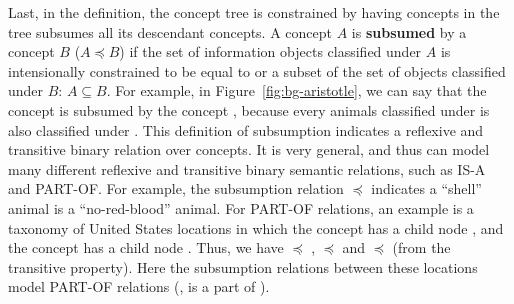 Last, in the definition, the concept tree is constrained by having concepts in the tree subsumes all its descendant concepts. A concept $A$ is \textbf{subsumed} by a concept $B$ ($A \preccurlyeq B$) if the set of information objects classified under $A$ is intensionally constrained to be equal to or a subset of the set of objects classified under $B$: $A \subseteq B$. For example, in Figure~\ref{fig:bg-aristotle}, we can say that the concept  is subsumed by the concept , because every animals classified under  is also classified under . This definition of subsumption indicates a reflexive and transitive binary relation over concepts. It is very general, and thus can model many different reflexive and transitive binary semantic relations, such as IS-A and PART-OF. For example, the subsumption relation  $\preccurlyeq$  indicates a ``shell'' animal is a ``no-red-blood'' animal. For PART-OF relations, an 
example is a taxonomy of United States locations in which the concept  has a child node , and the concept  has a child node . Thus, we have  $\preccurlyeq$ ,   $\preccurlyeq$  and  $\preccurlyeq$  (from the transitive property). Here the subsumption relations between these locations model PART-OF relations (\eg,  is a part of ).




